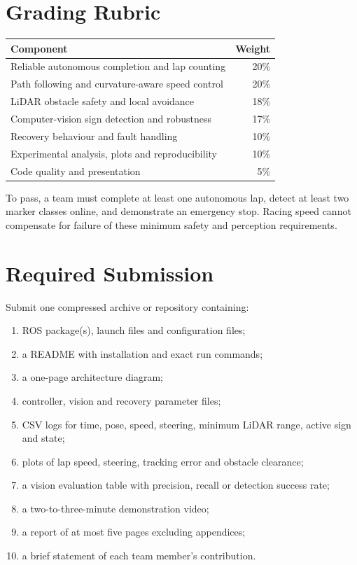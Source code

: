 \documentclass[11pt,a4paper]{article}
\begin{document}
\section{Grading Rubric}
\begin{center}
\begin{tabularx}{\textwidth}{Xr}
\toprule
Component & Weight\\
\midrule
Reliable autonomous completion and lap counting & 20\%\\
Path following and curvature-aware speed control & 20\%\\
LiDAR obstacle safety and local avoidance & 18\%\\
Computer-vision sign detection and robustness & 17\%\\
Recovery behaviour and fault handling & 10\%\\
Experimental analysis, plots and reproducibility & 10\%\\
Code quality and presentation & 5\%\\
\bottomrule
\end{tabularx}
\end{center}

To pass, a team must complete at least one autonomous lap, detect at least two marker classes online, and demonstrate an emergency stop. Racing speed cannot compensate for failure of these minimum safety and perception requirements.

\section{Required Submission}
Submit one compressed archive or repository containing:
\begin{enumerate}
  \item ROS package(s), launch files and configuration files;
  \item a README with installation and exact run commands;
  \item a one-page architecture diagram;
  \item controller, vision and recovery parameter files;
  \item CSV logs for time, pose, speed, steering, minimum LiDAR range, active sign and state;
  \item plots of lap speed, steering, tracking error and obstacle clearance;
  \item a vision evaluation table with precision, recall or detection success rate;
  \item a two-to-three-minute demonstration video;
  \item a report of at most five pages excluding appendices;
  \item a brief statement of each team member's contribution.
\end{enumerate}
\end{document}
